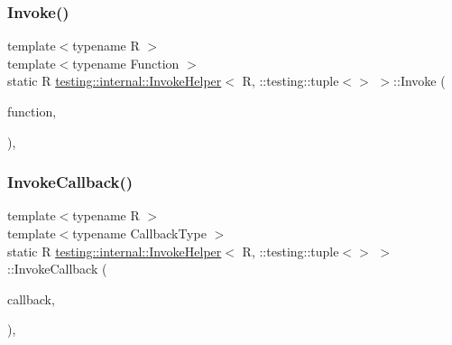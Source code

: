 \subsubsection{\texorpdfstring{Invoke()}{Invoke()}}
{\footnotesize\ttfamily template$<$typename R $>$ \\
template$<$typename Function $>$ \\
static R \mbox{\hyperlink{classtesting_1_1internal_1_1InvokeHelper}{testing\+::internal\+::\+Invoke\+Helper}}$<$ R, \+::testing\+::tuple$<$$>$ $>$\+::Invoke (\begin{DoxyParamCaption}\item[{\mbox{\hyperlink{structtesting_1_1internal_1_1Function}{Function}}}]{function,  }\item[{const \+::testing\+::tuple$<$$>$ \&}]{ }\end{DoxyParamCaption})\hspace{0.3cm}{\ttfamily [inline]}, {\ttfamily [static]}}

\mbox{\label{classtesting_1_1internal_1_1InvokeHelper_3_01R_00_01_1_1testing_1_1tuple_3_4_01_4_a9d81d455ebad0e8bf02a7d04c07ccb20}} 
\subsubsection{\texorpdfstring{InvokeCallback()}{InvokeCallback()}}
{\footnotesize\ttfamily template$<$typename R $>$ \\
template$<$typename Callback\+Type $>$ \\
static R \mbox{\hyperlink{classtesting_1_1internal_1_1InvokeHelper}{testing\+::internal\+::\+Invoke\+Helper}}$<$ R, \+::testing\+::tuple$<$$>$ $>$\+::Invoke\+Callback (\begin{DoxyParamCaption}\item[{Callback\+Type $\ast$}]{callback,  }\item[{const \+::testing\+::tuple$<$$>$ \&}]{ }\end{DoxyParamCaption})\hspace{0.3cm}{\ttfamily [inline]}, {\ttfamily [static]}}

